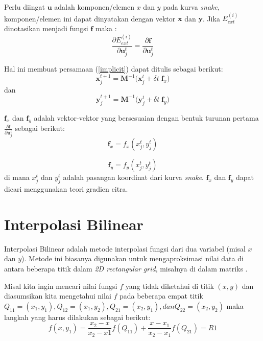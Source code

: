 Perlu diingat $\textbf{u}$ adalah komponen/elemen $x$ dan $y$ pada kurva \emph{snake}, komponen/elemen ini dapat dinyatakan dengan vektor $\textbf{x}$ dan $\textbf{y}$. Jika $E^{(i)}_{ext}$ dinotasikan menjadi fungsi $\textbf{f}$ maka :
\begin{equation}
	\label{ext_f}
	\frac{\partial E^{(i)}_{ext} }{ \partial \textbf{u}^{t}_{j}} = \frac{\partial \textbf{f} }{ \partial \textbf{u}^{t}_{j}}
\end{equation}

Hal ini membuat persamaan (\ref{implicit}) dapat ditulis sebagai berikut:
\begin{equation}
	\label{implicit_x}
	\textbf{x}^{t+1}_{j} = \textbf{M}^{-1} \biggl( \textbf{x}^t_{j} + \delta t \; \textbf{f}_{x} \biggr)
\end{equation}
dan
\begin{equation}
	\label{implicit_y}
	\textbf{y}^{t+1}_{j} = \textbf{M}^{-1} \biggl( \textbf{y}^t_{j} + \delta t \; \textbf{f}_{y} \biggr)
\end{equation}

$\textbf{f}_x$ dan $\textbf{f}_y$ adalah vektor-vektor yang bersesuaian dengan bentuk turunan pertama $\frac{\partial \textbf{f} }{ \partial \textbf{u}^{t}_{j}}$ sebagai berikut:
\begin{equation}
	\label{fx_eq}
	\textbf{f}_x = f_x(x^t_{j}, y^t_{j})
\end{equation}

\begin{equation}
	\label{fy_eq}
	\textbf{f}_y = f_y(x^t_{j}, y^t_{j})
\end{equation}
di mana $x^t_{j}$ dan $y^t_{j}$ adalah pasangan koordinat dari kurva \emph{snake}. $\textbf{f}_x$ dan $\textbf{f}_y$ dapat dicari menggunakan teori gradien citra.

\section{Interpolasi Bilinear}
Interpolasi Bilinear adalah metode interpolasi fungsi dari dua variabel (misal $x$ dan $y$). Metode ini biasanya digunakan untuk mengaproksimasi nilai data di antara beberapa titik dalam \emph{2D rectangular grid}, misalnya di dalam matriks \citep{william1997numerical}.

Misal kita ingin mencari nilai fungsi $f$ yang tidak diketahui di titik $(x,y)$ dan diasumsikan kita mengetahui nilai $f$ pada beberapa empat titik $Q_11 = (x_1, y_1), Q_12 = (x_1, y_2), Q_21 = (x_2, y_1), dan Q_22 = (x_2, y_2)$ maka langkah yang harus dilakukan sebagai berikut:
\begin{equation}
	\label{bilin_x1}
	f(x,y_1) = \frac{x_2 - x}{x_2 - x1} f(Q_11) + \frac{x - x_1}{x_2 - x_1} f(Q_21) = R1
\end{equation}

